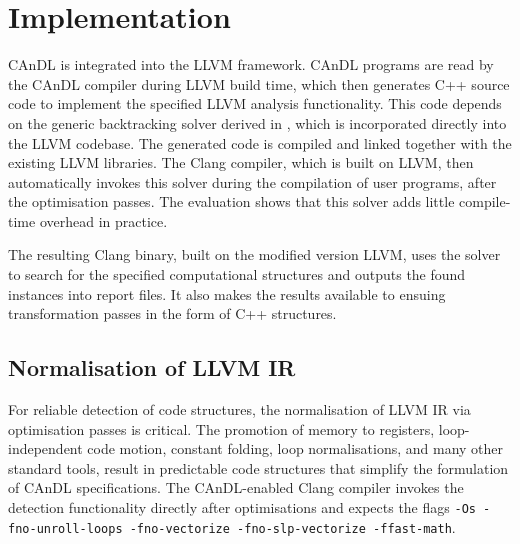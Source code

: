 \section{Implementation}

    CAnDL is integrated into the LLVM framework.
    CAnDL programs are read by the CAnDL compiler during LLVM build time, which
    then generates C++ source code to implement the specified LLVM analysis
    functionality.
    This code depends on the generic backtracking solver derived in
    , which is incorporated directly into the LLVM
    codebase.
    The generated code is compiled and linked together with the existing LLVM
    libraries.
    The Clang compiler, which is built on LLVM, then automatically invokes this
    solver during the compilation of user programs, after the optimisation
    passes.
    The evaluation shows that this solver adds little compile-time overhead in
    practice.

    The resulting Clang binary, built on the modified version LLVM, uses the
    solver to search for the specified computational structures and outputs the
    found instances into report files.
    It also makes the results available to ensuing transformation passes in the
    form of C++ structures.

\subsection{Normalisation of LLVM IR}

    For reliable detection of code structures, the normalisation of LLVM IR via
    optimisation passes is critical.
    The promotion of memory to registers, loop-independent code motion,
    constant folding, loop normalisations, and many other standard
    tools, result in predictable code structures that simplify the formulation
    of CAnDL specifications.
    The CAnDL-enabled Clang compiler invokes the detection functionality
    directly after optimisations and expects the flags
    {\tt -Os -fno-unroll-loops -fno-vectorize -fno-slp-vectorize -ffast-math}.

